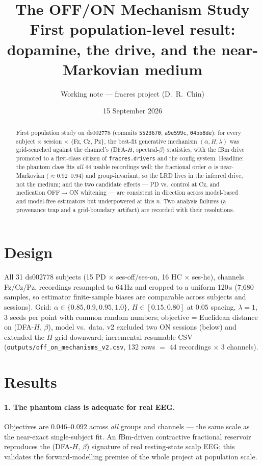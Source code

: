 \documentclass[11pt]{article}
\title{The OFF/ON Mechanism Study\\
\large First population-level result: dopamine, the drive, and the near-Markovian medium}
\author{Working note --- fracres project (D.~R.~Chin)}
\date{15 September 2026}
\begin{document}
\maketitle

\begin{abstract}
\noindent First population study on ds002778 (commits \texttt{5523670},
\texttt{a9e599c}, \texttt{04bb8de}): for every subject $\times$ session
$\times$ \{Fz, Cz, Pz\}, the best-fit generative mechanism $(\alpha, H,
\lambda)$ was grid-searched against the channel's (DFA-$H$, spectral-$\beta$)
statistics, with the fBm drive promoted to a first-class citizen of
\texttt{fracres.drivers} and the config system. Headline: the phantom class
fits \emph{all} 44 usable recordings well; the fractional order $\alpha$ is
near-Markovian ($\approx 0.92$--$0.94$) and group-invariant, so the LRD lives
in the inferred drive, not the medium; and the two candidate effects --- PD
vs.\ control at Cz, and medication OFF$\to$ON whitening --- are consistent in
direction across model-based and model-free estimators but underpowered at
this $n$. Two analysis failures (a provenance trap and a grid-boundary
artifact) are recorded with their resolutions.
\end{abstract}

\section{Design}

All 31 ds002778 subjects (15 PD $\times$ ses-off/ses-on, 16 HC $\times$
ses-hc), channels Fz/Cz/Pz, recordings resampled to 64\,Hz and cropped to a
uniform 120\,s (7{,}680 samples, so estimator finite-sample biases are
comparable across subjects and sessions). Grid: $\alpha \in \{0.85, 0.9,
0.95, 1.0\}$, $H \in [0.15, 0.80]$ at $0.05$ spacing, $\lambda = 1$, 3 seeds
per point with common random numbers; objective = Euclidean distance on
(DFA-$H$, $\beta$), model vs.\ data. v2 excluded two ON sessions (below) and
extended the $H$ grid downward; incremental resumable CSV
(\texttt{outputs/off\_on\_mechanisms\_v2.csv}, 132 rows $=$ 44 recordings
$\times$ 3 channels).

\section{Results}

\paragraph{1. The phantom class is adequate for real EEG.}
Objectives are $0.046$--$0.092$ across \emph{all} groups and channels ---
the same scale as the near-exact single-subject fit. An fBm-driven
contractive fractional reservoir reproduces the (DFA-$H$, $\beta$) signature
of real resting-state scalp EEG; this validates the forward-modelling
premise of the whole project at population scale.
\end{document}
